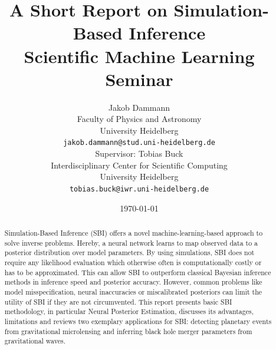 \documentclass[11pt,a4paper]{article}
\title{
    \vspace{-1em}
    A Short Report on Simulation-Based Inference\\[0.4em]
    \large Scientific Machine Learning Seminar}
\author{
\begin{minipage}[t]{0.48\textwidth}
  \centering
  Jakob Dammann\\
  \small Faculty of Physics and Astronomy\\ University Heidelberg\\
  \small \texttt{jakob.dammann@stud.uni-heidelberg.de}
\end{minipage}%
\hfill
\begin{minipage}[t]{0.48\textwidth}
  \centering
  Supervisor: Tobias Buck\\
  \small Interdisciplinary Center for Scientific Computing\\ University Heidelberg\\
  \small \texttt{tobias.buck@iwr.uni-heidelberg.de}
\end{minipage}
}
\date{\today}
\begin{document}
\maketitle

\begin{abstract}
\noindent
Simulation-Based Inference (SBI) offers a novel machine-learning-based approach to solve inverse problems. 
Hereby, a neural network learns to map observed data to a posterior distribution over model parameters.
By using simulations, SBI does not require any likelihood evaluation which otherwise often is computationally costly or has to be approximated.
This can allow SBI to outperform classical Bayesian inference methods in inference speed and posterior accuracy.
However, common problems like model misspecification, neural inaccuracies or miscalibrated posteriors can limit the utility of SBI if they are not circumvented.
This report presents basic SBI methodology, in particular Neural Posterior Estimation, discusses its advantages, limitations and reviews two exemplary applications for SBI: detecting planetary events from gravitational microlensing and inferring black hole merger parameters from gravitational waves.
\end{abstract}






\end{document}
